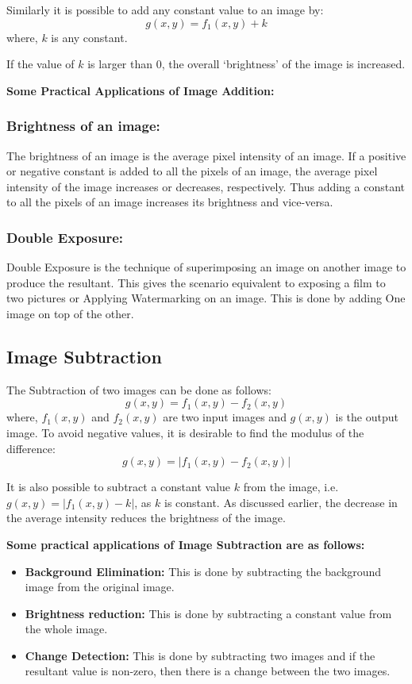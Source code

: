 Similarly it is possible to add any constant value to an image by:
$$g(x,y) = f_1(x,y) + k$$ where, $k$ is any constant.

If the value of $k$ is larger than 0, the overall `brightness' of the image is increased.

\textbf{Some Practical Applications of Image Addition:}
\subsubsection{Brightness of an image:}
The brightness of an image is the average pixel intensity of an image. If a positive or negative constant is added to all the pixels of an image, the average pixel intensity of the image increases or decreases, respectively. Thus adding a constant to all the pixels of an image increases its brightness and vice-versa. 

\subsubsection{Double Exposure:}
Double Exposure is the technique of superimposing an image on another image to produce the resultant. This gives the scenario equivalent to exposing a film to two pictures or Applying Watermarking on an image. This is done by adding One image on top of the other.

\subsection{Image Subtraction}

The Subtraction of two images can be done as follows:
$$g(x,y) = f_1(x,y) - f_2(x,y)$$
where, $f_1(x,y)$ and $f_2(x,y)$ are two input images and $g(x,y)$ is the output image.
To avoid negative values, it is desirable to find the modulus of the difference:
$$g(x,y) = |f_1(x,y) - f_2(x,y)|$$

It is also possible to subtract a constant value $k$ from the image, i.e. $g(x,y) = |f_1(x,y) - k|$, as $k$ is constant.
As discussed earlier, the decrease in the average intensity reduces the brightness of the image.

\textbf{Some practical applications of Image Subtraction are as follows:}
\begin{itemize}
    \item \textbf{Background Elimination:} This is done by subtracting the background image from the original image.
    \item \textbf{Brightness reduction:} This is done by subtracting a constant value from the whole image.
    \item \textbf{Change Detection:} This is done by subtracting two images and if the resultant value is non-zero, then there is a change between the two images.
\end{itemize}

